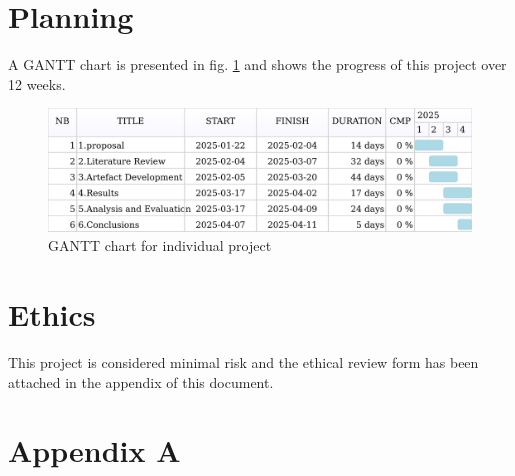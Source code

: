 \documentclass{article}
\begin{document}
\section{Planning}
A GANTT chart is presented in fig. \ref{gantt} and shows the progress of this project over 12 weeks.

\begin{figure}
	\includegraphics[scale=0.25]{DrawGanttMonth}
	\caption{GANTT chart for individual project}
	\label{gantt}
\end{figure}


\section{Ethics}
This project is considered minimal risk and the ethical review form has been attached in the appendix of this document.


%



\section*{Appendix A}

\end{document}
